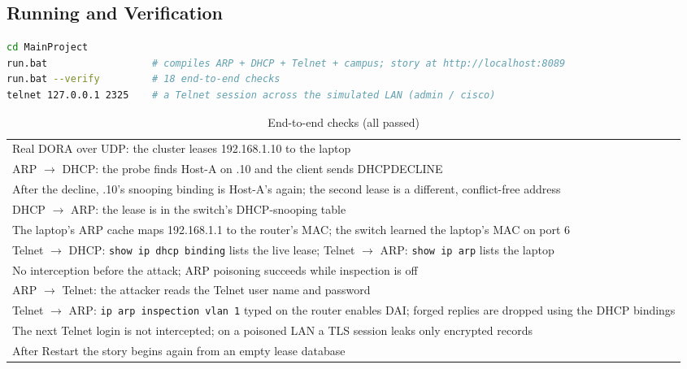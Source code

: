 \documentclass[11pt,a4paper]{article}
\begin{document}
\subsection{Running and Verification}
\begin{lstlisting}[language=bash, caption={Running the integrated project.}]
cd MainProject
run.bat                  # compiles ARP + DHCP + Telnet + campus; story at http://localhost:8089
run.bat --verify         # 18 end-to-end checks
telnet 127.0.0.1 2325    # a Telnet session across the simulated LAN (admin / cisco)
\end{lstlisting}

\begin{table}[H]
\centering
\caption{End-to-end checks (all passed)}
\small
\begin{tabularx}{\textwidth}{@{}Y@{}}
\toprule
Real DORA over UDP: the cluster leases 192.168.1.10 to the laptop \\
ARP $\rightarrow$ DHCP: the probe finds Host-A on .10 and the client sends DHCPDECLINE \\
After the decline, .10's snooping binding is Host-A's again; the second lease is a different, conflict-free address \\
DHCP $\rightarrow$ ARP: the lease is in the switch's DHCP-snooping table \\
The laptop's ARP cache maps 192.168.1.1 to the router's MAC; the switch learned the laptop's MAC on port 6 \\
Telnet $\rightarrow$ DHCP: \texttt{show ip dhcp binding} lists the live lease; Telnet $\rightarrow$ ARP: \texttt{show ip arp} lists the laptop \\
No interception before the attack; ARP poisoning succeeds while inspection is off \\
ARP $\rightarrow$ Telnet: the attacker reads the Telnet user name and password \\
Telnet $\rightarrow$ ARP: \texttt{ip arp inspection vlan 1} typed on the router enables DAI; forged replies are dropped using the DHCP bindings \\
The next Telnet login is not intercepted; on a poisoned LAN a TLS session leaks only encrypted records \\
After Restart the story begins again from an empty lease database \\ \bottomrule
\end{tabularx}
\end{table}

\end{document}
